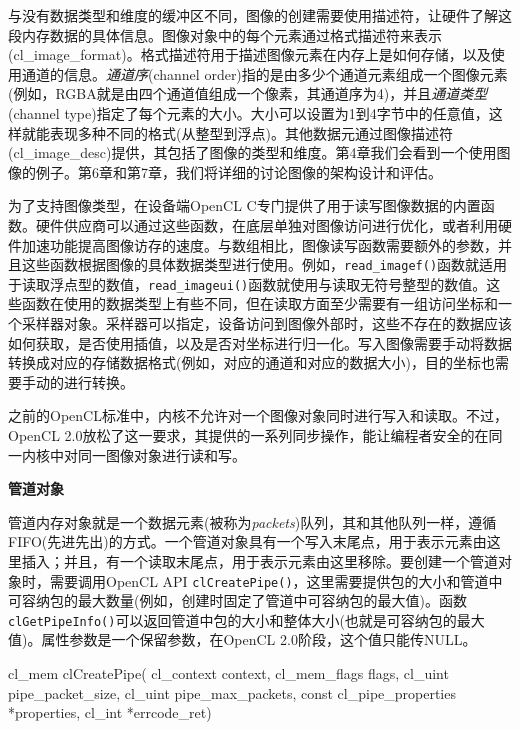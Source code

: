 与没有数据类型和维度的缓冲区不同，图像的创建需要使用描述符，让硬件了解这段内存数据的具体信息。图像对象中的每个元素通过格式描述符来表示(cl\_\allowbreak{}image\_\allowbreak{}format)。格式描述符用于描述图像元素在内存上是如何存储，以及使用通道的信息。\emph{通道序}(channel order)指的是由多少个通道元素组成一个图像元素(例如，RGBA就是由四个通道值组成一个像素，其通道序为4)，并且\emph{通道类型}(channel type)指定了每个元素的大小。大小可以设置为1到4字节中的任意值，这样就能表现多种不同的格式(从整型到浮点)。其他数据元通过图像描述符(cl\_\allowbreak{}image\_\allowbreak{}desc)提供，其包括了图像的类型和维度。第4章我们会看到一个使用图像的例子。第6章和第7章，我们将详细的讨论图像的架构设计和评估。

为了支持图像类型，在设备端OpenCL C专门提供了用于读写图像数据的内置函数。硬件供应商可以通过这些函数，在底层单独对图像访问进行优化，或者利用硬件加速功能提高图像访存的速度。与数组相比，图像读写函数需要额外的参数，并且这些函数根据图像的具体数据类型进行使用。例如，\texttt{read\_imagef()}函数就适用于读取浮点型的数值，\texttt{read\_imageui()}函数就使用与读取无符号整型的数值。这些函数在使用的数据类型上有些不同，但在读取方面至少需要有一组访问坐标和一个采样器对象。采样器可以指定，设备访问到图像外部时，这些不存在的数据应该如何获取，是否使用插值，以及是否对坐标进行归一化。写入图像需要手动将数据转换成对应的存储数据格式(例如，对应的通道和对应的数据大小)，目的坐标也需要手动的进行转换。

之前的OpenCL标准中，内核不允许对一个图像对象同时进行写入和读取。不过，OpenCL 2.0放松了这一要求，其提供的一系列同步操作，能让编程者安全的在同一内核中对同一图像对象进行读和写。

\textbf{管道对象}

管道内存对象就是一个数据元素(被称为\emph{packets})队列，其和其他队列一样，遵循FIFO(先进先出)的方式。一个管道对象具有一个写入末尾点，用于表示元素由这里插入；并且，有一个读取末尾点，用于表示元素由这里移除。要创建一个管道对象时，需要调用OpenCL API \texttt{clCreatePipe()}，这里需要提供包的大小和管道中可容纳包的最大数量(例如，创建时固定了管道中可容纳包的最大值)。函数\texttt{clGetPipeInfo()}可以返回管道中包的大小和整体大小(也就是可容纳包的最大值)。属性参数是一个保留参数，在OpenCL 2.0阶段，这个值只能传NULL。

\begin{codebox}[cpp]
cl_mem
clCreatePipe(
  cl_context context,
  cl_mem_flags flags,
  cl_uint pipe_packet_size,
  cl_uint pipe_max_packets,
  const cl_pipe_properties *properties,
  cl_int *errcode_ret)
\end{codebox}

